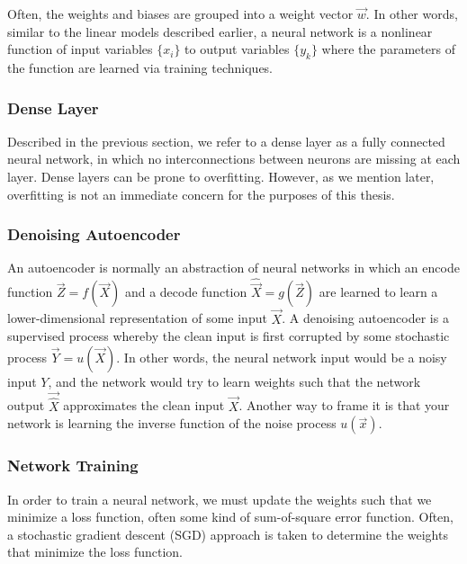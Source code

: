 Often, the weights and biases are grouped into a weight vector $\vec{w}$. In other words, similar to the linear models described earlier, a neural network is a nonlinear function of input variables $\{x_i\}$ to output variables $\{y_k\}$ where the parameters of the function are learned via training techniques.

\subsubsection{Dense Layer}

Described in the previous section, we refer to a dense layer as a fully connected neural network, in which no interconnections between neurons are missing at each layer. Dense layers can be prone to overfitting. However, as we mention later, overfitting is not an immediate concern for the purposes of this thesis.

\subsubsection{Denoising Autoencoder}

An autoencoder is normally an abstraction of neural networks in which an encode function $\vec{Z}=f(\vec{X})$ and a decode function $\hat{\vec{X}}=g(\vec{Z})$ are learned to learn a lower-dimensional representation of some input $\vec{X}$. \cite{stow} A denoising autoencoder is a supervised process whereby the clean input is first corrupted by some stochastic process $\vec{Y}=u(\vec{X})$. In other words, the neural network input would be a noisy input $Y$, and the network would try to learn weights such that the network output $\vec{\hat{X}}$ approximates the clean input $\vec{X}$. Another way to frame it is that your network is learning the inverse function of the noise process $u(\vec{x})$.




\subsubsection{Network Training}

In order to train a neural network, we must update the weights such that we minimize a loss function, often some kind of sum-of-square error function. \cite{bishop} Often, a stochastic gradient descent (SGD) approach is taken to determine the weights that minimize the loss function.



